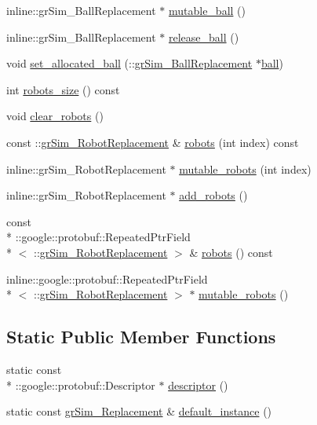 \begin{DoxyCompactItemize}
\item 
inline\-::gr\-Sim\-\_\-\-Ball\-Replacement $\ast$ \hyperlink{classgr_sim___replacement_a56c4da47cc0be2de73e2e719970af91c}{mutable\-\_\-ball} ()
\item 
inline\-::gr\-Sim\-\_\-\-Ball\-Replacement $\ast$ \hyperlink{classgr_sim___replacement_ac4b83c8eb0b9466f91c86f1e251b253f}{release\-\_\-ball} ()
\item 
void \hyperlink{classgr_sim___replacement_af7743d08d15ec6d207b47fd1a050b657}{set\-\_\-allocated\-\_\-ball} (\-::\hyperlink{classgr_sim___ball_replacement}{gr\-Sim\-\_\-\-Ball\-Replacement} $\ast$\hyperlink{classgr_sim___replacement_ab890efa0f7a5a7fd347489265ba561fa}{ball})
\item 
int \hyperlink{classgr_sim___replacement_aec9fb029fbf476bfba5dc373314786ad}{robots\-\_\-size} () const 
\item 
void \hyperlink{classgr_sim___replacement_ae1aa19fdcaa81efb1eded83b6116aacd}{clear\-\_\-robots} ()
\item 
const \-::\hyperlink{classgr_sim___robot_replacement}{gr\-Sim\-\_\-\-Robot\-Replacement} \& \hyperlink{classgr_sim___replacement_a431c790c2b148f72632caa6bcbb9900b}{robots} (int index) const 
\item 
inline\-::gr\-Sim\-\_\-\-Robot\-Replacement $\ast$ \hyperlink{classgr_sim___replacement_af3792549eaeb2c6993ae5cac2c6fdc5c}{mutable\-\_\-robots} (int index)
\item 
inline\-::gr\-Sim\-\_\-\-Robot\-Replacement $\ast$ \hyperlink{classgr_sim___replacement_a740c2407c5fb491de27d32b368fa04d9}{add\-\_\-robots} ()
\item 
const \\*
\-::google\-::protobuf\-::\-Repeated\-Ptr\-Field\\*
$<$ \-::\hyperlink{classgr_sim___robot_replacement}{gr\-Sim\-\_\-\-Robot\-Replacement} $>$ \& \hyperlink{classgr_sim___replacement_a56ce9045ba73898b31cd28bcf5413521}{robots} () const 
\item 
inline\-::google\-::protobuf\-::\-Repeated\-Ptr\-Field\\*
$<$ \-::\hyperlink{classgr_sim___robot_replacement}{gr\-Sim\-\_\-\-Robot\-Replacement} $>$ $\ast$ \hyperlink{classgr_sim___replacement_aebcef00d2a7a7c1802491c9777fef06b}{mutable\-\_\-robots} ()
\end{DoxyCompactItemize}
\subsection*{Static Public Member Functions}
\begin{DoxyCompactItemize}
\item 
static const \\*
\-::google\-::protobuf\-::\-Descriptor $\ast$ \hyperlink{classgr_sim___replacement_ae96f86a8c5404dc9fd9306d9e1b7e228}{descriptor} ()
\item 
static const \hyperlink{classgr_sim___replacement}{gr\-Sim\-\_\-\-Replacement} \& \hyperlink{classgr_sim___replacement_af794d47f4f09bd1a3d0d5c11d6940f43}{default\-\_\-instance} ()
\end{DoxyCompactItemize}
